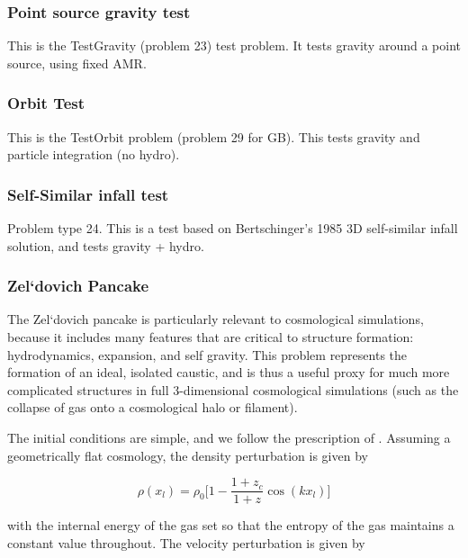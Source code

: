 \subsubsection{Point source gravity test}
\label{sec.test.gravitypointsource}
This is the TestGravity (problem 23) test problem.  It tests gravity around a point source, using fixed AMR.

\subsubsection{Orbit Test}
\label{sec.test.testorbit}
This is the TestOrbit problem (problem 29 for GB).  This tests gravity and particle integration (no hydro).

\subsubsection{Self-Similar infall test}
\label{sec.tests.infall}
Problem type 24.  This is a test based on Bertschinger's 1985 3D self-similar infall
solution, and tests gravity + hydro.

\subsubsection{Zel`dovich Pancake}
\label{sec.tests.pancake}

The Zel`dovich pancake \citep{1970A&A.....5...84Z} is particularly
relevant to cosmological simulations, because it includes many
features that are critical to structure formation: hydrodynamics,
expansion, and self gravity.  This problem represents the formation of an ideal,
isolated caustic, and is thus a useful proxy for much more
complicated structures in full 3-dimensional cosmological simulations
(such as the collapse of gas onto a cosmological halo or filament).

The initial conditions are simple, and we follow the prescription of
\citet{Anninos94}.  Assuming a geometrically flat cosmology, the density
perturbation is given by

\begin{equation}
\rho(x_l) = \rho_0 \big[ 1 - \frac{1+z_c}{1+z} \cos(k x_l) \big]
\end{equation}

with the internal energy of the gas set so that the entropy of the gas
maintains a constant value throughout.  The velocity perturbation is given by

